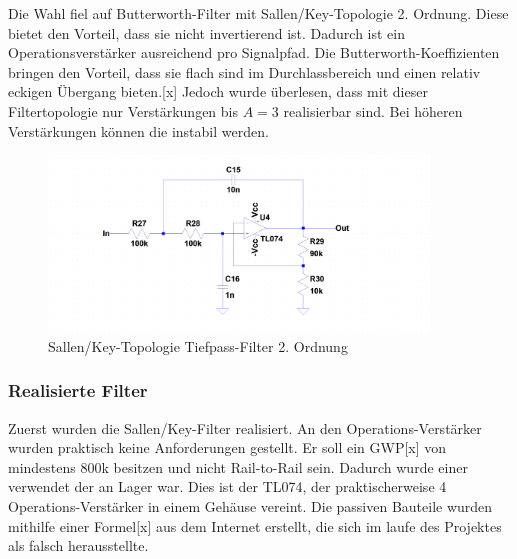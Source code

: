 \begin{minipage}[h]{0.5\textwidth}
Die Wahl fiel auf Butterworth-Filter mit Sallen/Key-Topologie 2. Ordnung. Diese bietet den Vorteil, dass sie nicht invertierend ist. Dadurch ist ein Operationsverstärker ausreichend pro Signalpfad. Die Butterworth-Koeffizienten bringen den Vorteil, dass sie flach sind im Durchlassbereich und einen relativ eckigen Übergang bieten.[x] Jedoch wurde überlesen, dass mit dieser Filtertopologie nur Verstärkungen bis $A=3$ realisierbar sind. Bei höheren Verstärkungen können die instabil werden. 
\end{minipage}
\begin{minipage}[h]{0.5\textwidth} 
\begin{figure}[H]
\begin{center}
\includegraphics[width=0.9\textwidth]{images/Analoge_Schaltung_Sallen.png}
\caption{Sallen/Key-Topologie Tiefpass-Filter 2. Ordnung}
\end{center}
\end{figure}
\end{minipage}


\subsubsection*{Realisierte Filter}
Zuerst wurden die Sallen/Key-Filter realisiert. An den Operations-Verstärker wurden praktisch keine Anforderungen gestellt. Er soll ein GWP[x] von mindestens 800k besitzen und nicht Rail-to-Rail sein. Dadurch wurde einer verwendet der an Lager war. Dies ist der TL074, der praktischerweise 4 Operations-Verstärker in einem Gehäuse vereint. Die passiven Bauteile wurden mithilfe einer Formel[x] aus dem Internet erstellt, die sich im laufe des Projektes als falsch herausstellte.


